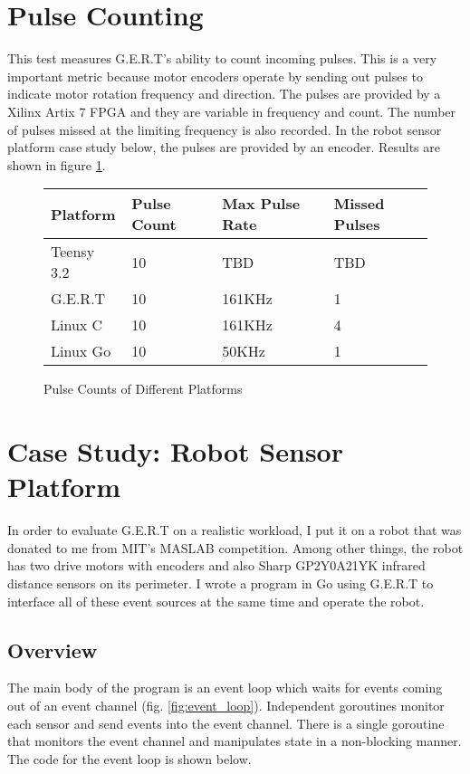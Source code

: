 \section{Pulse Counting}
This test measures G.E.R.T's ability to count incoming pulses. This is a very
important metric because motor encoders operate by sending out pulses to indicate
motor rotation frequency and direction. The pulses are provided by a Xilinx Artix 7
FPGA and they are variable in frequency and count. The number of pulses missed at
the limiting frequency is also recorded. In the robot sensor platform
case study below, the pulses are provided by an encoder. Results are shown in
figure \ref{fig:counter}. \\

\begin{figure} [h]
\begin{center}
  \begin{tabular}{ | l | l | l | l |}
    \hline
    Platform & Pulse Count & Max Pulse Rate & Missed Pulses \\ \hline
    Teensy 3.2 & 10 & TBD & TBD \\ \hline
    G.E.R.T & 10 & 161KHz & 1 \\ \hline
    Linux C & 10 & 161KHz & 4 \\ \hline
    Linux Go & 10 & 50KHz & 1 \\
    \hline
  \end{tabular}
\end{center}
  \caption{Pulse Counts of Different Platforms}  \label{fig:counter}
\end{figure}

\clearpage
\section{Case Study: Robot Sensor Platform}
In order to evaluate G.E.R.T on a realistic workload, I put it on a robot that was
donated to me from MIT's MASLAB competition. Among other things, the robot has two drive
motors with encoders and also Sharp GP2Y0A21YK infrared distance sensors on its perimeter.
I wrote a program in Go using G.E.R.T to interface all of these event sources at the same time
and operate the robot.

\subsection{Overview}
The main body of the program is an event loop which waits for events coming out of an event channel (fig. \ref{fig:event_loop}).
Independent goroutines monitor each sensor and send events into the event channel. There is a
single goroutine that monitors the event channel and manipulates state in a non-blocking manner. The code for the
event loop is shown below.

